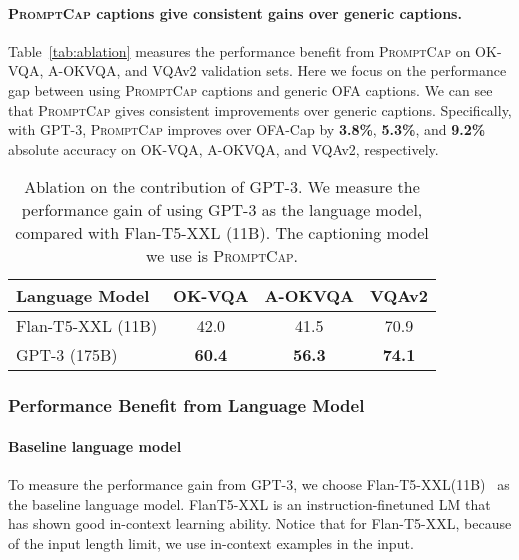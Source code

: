 \documentclass[10pt,twocolumn,letterpaper]{article}
\newcommand{\NAME}{\textsc{PromptCap}\xspace}
\begin{document}
\vspace{-0.1in}
\paragraph{\NAME captions give consistent gains over generic captions.}Table~\ref{tab:ablation} measures the performance benefit from \NAME on OK-VQA, A-OKVQA, and VQAv2 validation sets.
Here we focus on the performance gap between using \NAME captions and generic OFA captions.
We can see that \NAME gives consistent improvements over generic captions. 
Specifically, with GPT-3, \NAME improves over OFA-Cap by \textbf{3.8\%}, \textbf{5.3\%}, and \textbf{9.2\%} absolute accuracy on OK-VQA, A-OKVQA, and VQAv2, respectively.


\begin{table}[th]
\small
\centering
\caption{
Ablation on the contribution of GPT-3. We measure the performance gain of using GPT-3 as the language model, compared with Flan-T5-XXL (11B).
The captioning model we use is \NAME.
}
\begin{tabular}{l|ccc}
\toprule[1.2pt]
Language Model & OK-VQA & A-OKVQA & VQAv2 \\
\midrule
Flan-T5-XXL (11B) & 42.0 & 41.5 & 70.9\\
GPT-3 (175B) & \textbf{60.4} & \textbf{56.3} & \textbf{74.1} \\
\bottomrule[1.2pt]
\end{tabular}
\label{tab:ablation_gpt3}
\end{table} 

\vspace{-0.1in}
\subsubsection{Performance Benefit from Language Model}

\paragraph{Baseline language model} To measure the performance gain from GPT-3, we choose Flan-T5-XXL(11B)~\cite{Chung2022ScalingIL} as the baseline language model. FlanT5-XXL is an instruction-finetuned LM that has shown good in-context learning ability. Notice that for Flan-T5-XXL, because of the input length limit, we use  in-context examples in the input.
\end{document}
